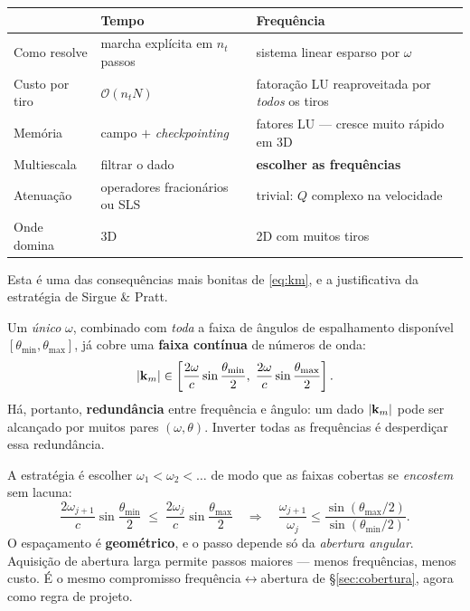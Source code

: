 \documentclass[11pt,a4paper,oneside]{report}
\begin{document}
\begin{center}
\begin{tabular}{@{}lp{4.6cm}p{4.9cm}@{}}
\toprule
 & \textbf{Tempo} & \textbf{Frequ\^encia} \\
\midrule
Como resolve & marcha expl\'icita em $n_t$ passos
  & sistema linear esparso por $\omega$ \\
Custo por tiro & $\mathcal{O}(n_t N)$ & fatora\c{c}\~ao LU reaproveitada por
  \emph{todos} os tiros \\
Mem\'oria & campo $+$ \emph{checkpointing} & fatores LU --- cresce muito
  r\'apido em 3D \\
Multiescala & filtrar o dado & \textbf{escolher as frequ\^encias} \\
Atenua\c{c}\~ao & operadores fracion\'arios ou SLS & trivial: $Q$ complexo
  na velocidade \\
Onde domina & 3D & 2D com muitos tiros \\
\bottomrule
\end{tabular}
\end{center}

\begin{teoria}
Esta \'e uma das consequ\^encias mais bonitas de \eqref{eq:km}, e a
justificativa da estrat\'egia de Sirgue \& Pratt.

Um \emph{\'unico} $\omega$, combinado com \emph{toda} a faixa de \^angulos de
espalhamento dispon\'ivel $[\theta_{\min},\theta_{\max}]$, j\'a cobre uma
\textbf{faixa cont\'inua} de n\'umeros de onda:
\[
\lvert \mathbf{k}_m \rvert \in
\left[\frac{2\omega}{c}\sin\frac{\theta_{\min}}{2},\;
      \frac{2\omega}{c}\sin\frac{\theta_{\max}}{2}\right].
\]
H\'a, portanto, \textbf{redund\^ancia} entre frequ\^encia e \^angulo: um dado
$\lvert \mathbf{k}_m \rvert$ pode ser alcan\c{c}ado por muitos pares
$(\omega,\theta)$. Inverter todas as frequ\^encias \'e desperdi\c{c}ar essa
redund\^ancia.

A estrat\'egia \'e escolher $\omega_1 < \omega_2 < \dots$ de modo que as
faixas cobertas se \emph{encostem} sem lacuna:
\[
\frac{2\omega_{j+1}}{c}\sin\frac{\theta_{\min}}{2}
 \;\le\; \frac{2\omega_{j}}{c}\sin\frac{\theta_{\max}}{2}
\quad\Longrightarrow\quad
\frac{\omega_{j+1}}{\omega_j} \le
\frac{\sin(\theta_{\max}/2)}{\sin(\theta_{\min}/2)} .
\]
O espa\c{c}amento \'e \textbf{geom\'etrico}, e o passo depende s\'o da
\emph{abertura angular}. Aquisi\c{c}\~ao de abertura larga permite passos
maiores --- menos frequ\^encias, menos custo. \'E o mesmo compromisso
frequ\^encia$\leftrightarrow$abertura de §\ref{sec:cobertura}, agora como
regra de projeto.
\end{teoria}
\end{document}
